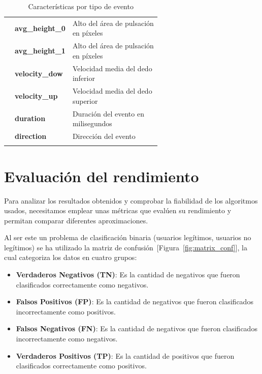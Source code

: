 \begin{center}
\begin{longtable}{l l p{0.6\linewidth}}
                              & \textbf{avg\_height\_0}  & Alto del área de pulsación en píxeles\\ 
                              & \textbf{avg\_height\_1}  & Alto del área de pulsación en píxeles\\ 
                              & \textbf{velocity\_dow}   & Velocidad media del dedo inferior\\ 
                              & \textbf{velocity\_up}    & Velocidad media del dedo superior\\ 
                              & \textbf{duration}        & Duración del evento en milisegundos\\ 
                              & \textbf{direction}      & Dirección del evento \\

    \bottomrule
    \caption{Características por tipo de evento}
    \label{tab:event_features}
    \end{longtable}
\end{center}



\section{Evaluación del rendimiento}
\label{sec:metrics}

Para analizar los resultados obtenidos y comprobar la fiabilidad de los algoritmos usados, necesitamos emplear unas métricas que evalúen su rendimiento y permitan comparar diferentes aproximaciones.

Al ser este un problema de clasificación binaria (usuarios legítimos, usuarios no legítimos) se ha utilizado la matriz de confusión~[Figura~\ref{fig:matrix_conf}], la cual categoriza los datos en cuatro grupos:


\begin{itemize}
    \item \textbf{Verdaderos Negativos (TN)}: Es la cantidad de negativos que fueron clasificados correctamente como negativos.
    
    \item \textbf{Falsos Positivos (FP)}: Es la cantidad de negativos que fueron clasificados incorrectamente como positivos.
    
    \item \textbf{Falsos Negativos (FN)}: Es la cantidad de negativos que fueron clasificados incorrectamente como negativos.
    
    \item \textbf{Verdaderos Positivos (TP)}: Es la cantidad de positivos que fueron clasificados correctamente como positivos.
\end{itemize}


